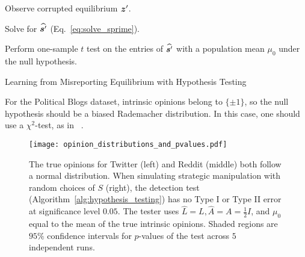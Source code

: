 \begin{algorithm}[t]
\SetAlgoLined
{}

Observe corrupted equilibrium $\bm{z}^\prime$. 

Solve for $\widehat{\bm{s}^\prime}$ (Eq.~\eqref{eq:solve_sprime}). 


Perform one-sample $t$ test on the entries of $\widehat{\bm{s}^\prime}$ with a population mean $\mu_0$ under the null hypothesis. 

\caption{Learning from Misreporting Equilibrium with Hypothesis Testing}
\label{alg:hypothesis_testing}
\end{algorithm}



For the Political Blogs dataset, intrinsic opinions belong to $\{\pm 1\}$, so the null hypothesis should be a biased Rademacher distribution. In this case, one should use a $\chi^2$-test, as in ~\citet{agarwal2020chisel,chen2022antibenford}. 






\begin{figure}
    \centering
    \texttt{[image: opinion\_distributions\_and\_pvalues.pdf]}
    \caption{The true opinions for Twitter (left) and Reddit (middle) both follow a normal distribution. When simulating strategic manipulation with random choices of $S$ (right), the detection test (Algorithm~\ref{alg:hypothesis_testing}) has no Type I or Type II error at significance level $0.05$. The tester uses $\widehat{L} = L, \widehat{A} = A = \frac{1}{2} I$, and $\mu_0$ equal to the mean of the true intrinsic opinions. Shaded regions are $95\%$ confidence intervals for $p$-values of the test across $5$ independent runs.}
    \label{fig:t_test}
\end{figure}


